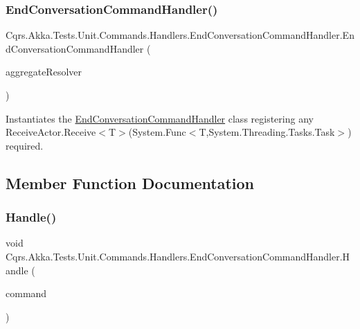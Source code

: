\subsubsection{\texorpdfstring{End\+Conversation\+Command\+Handler()}{EndConversationCommandHandler()}}
{\footnotesize\ttfamily Cqrs.\+Akka.\+Tests.\+Unit.\+Commands.\+Handlers.\+End\+Conversation\+Command\+Handler.\+End\+Conversation\+Command\+Handler (\begin{DoxyParamCaption}\item[{\hyperlink{interfaceCqrs_1_1Akka_1_1Domain_1_1IAkkaAggregateResolver}{I\+Akka\+Aggregate\+Resolver}}]{aggregate\+Resolver }\end{DoxyParamCaption})}



Instantiates the \hyperlink{classCqrs_1_1Akka_1_1Tests_1_1Unit_1_1Commands_1_1Handlers_1_1EndConversationCommandHandler}{End\+Conversation\+Command\+Handler} class registering any Receive\+Actor.\+Receive$<$\+T$>$(\+System.\+Func$<$\+T,\+System.\+Threading.\+Tasks.\+Task$>$) required. 



\subsection{Member Function Documentation}
\mbox{\label{classCqrs_1_1Akka_1_1Tests_1_1Unit_1_1Commands_1_1Handlers_1_1EndConversationCommandHandler_a45cc1e01d68fb5b241c9e46b333a149e_a45cc1e01d68fb5b241c9e46b333a149e}} 
\subsubsection{\texorpdfstring{Handle()}{Handle()}}
{\footnotesize\ttfamily void Cqrs.\+Akka.\+Tests.\+Unit.\+Commands.\+Handlers.\+End\+Conversation\+Command\+Handler.\+Handle (\begin{DoxyParamCaption}\item[{\hyperlink{classCqrs_1_1Akka_1_1Tests_1_1Unit_1_1Commands_1_1EndConversationCommand}{End\+Conversation\+Command}}]{command }\end{DoxyParamCaption})}



